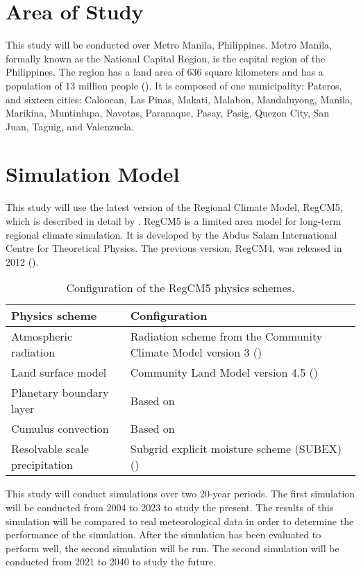 \section{Area of Study}
	This study will be conducted over Metro Manila, Philippines.
	Metro Manila, formally known as the National Capital Region, is the capital region of the Philippines.
	The region has a land area of 636 square kilometers	and has a population of 13 million people (\cite{PSA2021}).
	It is composed of one municipality: Pateros, and sixteen cities:
		Caloocan,
		Las Pinas,
		Makati,
		Malabon,
		Mandaluyong,
		Manila,
		Marikina,
		Muntinlupa,
		Navotas,
		Paranaque,
		Pasay,
		Pasig,
		Quezon City,
		San Juan,
		Taguig, and
		Valenzuela.
		
\section{Simulation Model}
	This study will use the latest version of the Regional Climate Model, RegCM5, which is described in detail by \textcite{Giorgi2023}.
	RegCM5 is a limited area model for long-term regional climate simulation.
	It is developed by the Abdus Salam International Centre for Theoretical Physics.
	The previous version, RegCM4, was released in 2012 (\cite{Giorgi2012}).
	
	\begin{table}	
		\caption{Configuration of the RegCM5 physics schemes.}
		\label{tab:physics-schemes}
		\centering
		\begin{tabular}{p{2 in} p{2.75 in}}
			\hline \hline
			Physics scheme & Configuration\\
			\hline
			Atmospheric radiation & Radiation scheme from the Community Climate Model version 3 (\cite{Kiehl1996}) \\
			Land surface model & Community Land Model version 4.5 (\cite{Oleson2013})\\
			Planetary boundary layer & Based on \textcite{Holtslag1990}\\
			Cumulus convection & Based on \textcite{Emanuel1991}\\
			Resolvable scale precipitation & Subgrid explicit moisture scheme (SUBEX) (\cite{Pal2000})\\
			\hline
		\end{tabular}		
	\end{table}

	This study will conduct simulations over two 20-year periods.
	The first simulation will be conducted from 2004 to 2023 to study the present.
	The results of this simulation will be compared to real meteorological data in order to determine the performance of the simulation.
	After the simulation has been evaluated to perform well, the second simulation will be run.
	The second simulation will be conducted from 2021 to 2040 to study the future.	
	
